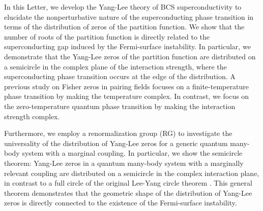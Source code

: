 \documentclass[aps,prl,twocolumn,superscriptaddress]{revtex4-1}
\begin{document}
\begin{bibunit}[apsrev4-2]
In this Letter, we develop the Yang-Lee theory of BCS superconductivity to elucidate the nonperturbative nature of the superconducting phase transition in terms of the distribution of zeros of the partition function. We show that the number of roots of the partition function is directly related to the superconducting gap induced by the Fermi-surface instability. In particular, we demonstrate that the Yang-Lee zeros of the partition function are distributed on a semicircle in the complex plane of the interaction strength, where the superconducting phase transition occurs at the edge of the distribution.
A previous study \cite{Sumaryada:2007uu} on Fisher zeros in pairing fields focuses on a finite-temperature phase transition by making the temperature complex. In contrast, we focus on the zero-temperature quantum phase transition by making the interaction strength complex.  %
\begin{comment}
In this Letter, we develop a theory of Yang-Lee zeros in BCS superconductivity and show that Yang-Lee zeros are distributed on a semicircle on the complex plane of interaction strength due to the Fermi-surface pairing instability.
We demonstrate that the superconducting phase transition occurs at
the edge of the distribution of Yang-Lee zeros and the nonperturbative
behavior of the phase transition is encoded in the number of roots of the partition function in the energy space. In contrast to a previous study \cite{Sumaryada:2007uu} on Fisher zeros in pairing fields at complex temperature in a finite-temperature phase transition, we extend the interaction strength to a complex regime at absolute zero with a focus on the quantum phase transition.
\end{comment}


Furthermore, we employ a renormalization group (RG) to investigate the 
universality of the distribution of Yang-Lee zeros
for a generic quantum many-body system with a marginal coupling. In particular, we show the semicircle theorem: Yang-Lee zeros in a quantum many-body system with a marginally relevant coupling are distributed on a semicircle
in the complex interaction plane, in contrast to a full circle of the original Lee-Yang circle
theorem \cite{PhysRev.87.404,PhysRev.87.410}. This general theorem demonstrates that the geometric shape of the distribution of Yang-Lee zeros is directly connected to the existence of the Fermi-surface instability.%


\end{bibunit}
\end{document}
